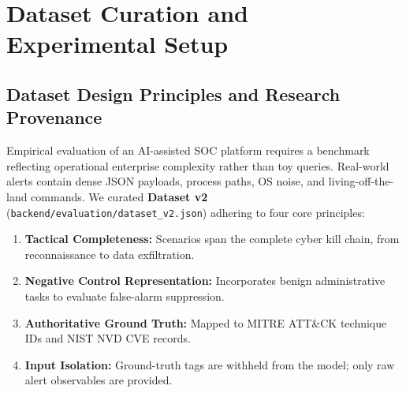 \chapter{Dataset Curation and Experimental Setup}
\label{ch:experiments}
\label{chap:dataset_experiments}

\section{Dataset Design Principles and Research Provenance}
\label{sec:dataset_design}
Empirical evaluation of an AI-assisted SOC platform requires a benchmark reflecting operational enterprise complexity rather than toy queries. Real-world alerts contain dense JSON payloads, process paths, OS noise, and living-off-the-land commands. We curated \textbf{Dataset v2} (\texttt{backend/evaluation/dataset\_v2.json}) adhering to four core principles:
\begin{enumerate}
    \item \textbf{Tactical Completeness:} Scenarios span the complete cyber kill chain, from reconnaissance to data exfiltration.
    \item \textbf{Negative Control Representation:} Incorporates benign administrative tasks to evaluate false-alarm suppression.
    \item \textbf{Authoritative Ground Truth:} Mapped to MITRE ATT\&CK technique IDs and NIST NVD CVE records.
    \item \textbf{Input Isolation:} Ground-truth tags are withheld from the model; only raw alert observables are provided.
\end{enumerate}

